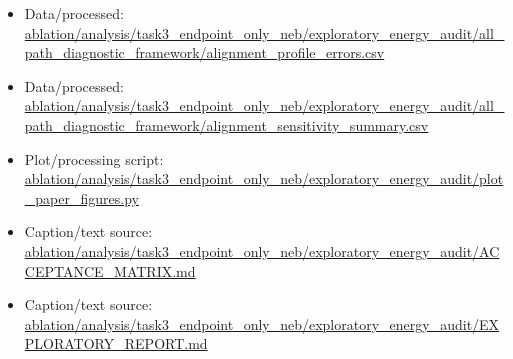 \begin{itemize}[leftmargin=1.4em,noitemsep]
\item Data/processed: \begingroup\scriptsize\url{ablation/analysis/task3_endpoint_only_neb/exploratory_energy_audit/all_path_diagnostic_framework/alignment_profile_errors.csv}\endgroup
\item Data/processed: \begingroup\scriptsize\url{ablation/analysis/task3_endpoint_only_neb/exploratory_energy_audit/all_path_diagnostic_framework/alignment_sensitivity_summary.csv}\endgroup
\item Plot/processing script: \begingroup\scriptsize\url{ablation/analysis/task3_endpoint_only_neb/exploratory_energy_audit/plot_paper_figures.py}\endgroup
\item Caption/text source: \begingroup\scriptsize\url{ablation/analysis/task3_endpoint_only_neb/exploratory_energy_audit/ACCEPTANCE_MATRIX.md}\endgroup
\item Caption/text source: \begingroup\scriptsize\url{ablation/analysis/task3_endpoint_only_neb/exploratory_energy_audit/EXPLORATORY_REPORT.md}\endgroup
\end{itemize}
